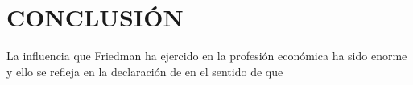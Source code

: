 \chapter{CONCLUSIÓN}
La influencia que Friedman ha ejercido en la profesión económica ha sido enorme y ello se refleja en la declaración de \cite{palley2014economia} en el sentido de que 